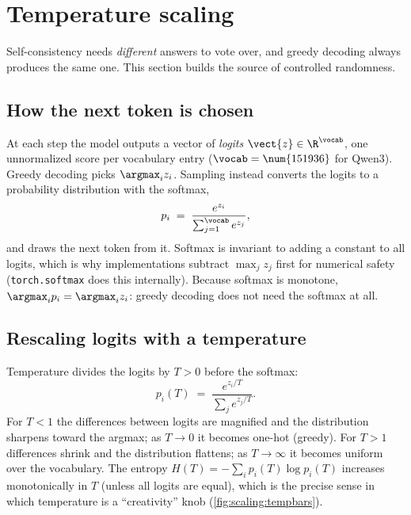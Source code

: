 \section{Temperature scaling}\label{sec:scaling:temp}

Self-consistency needs \emph{different} answers to vote over, and greedy decoding always produces
the same one. This section builds the source of controlled randomness.

\subsection{How the next token is chosen}\label{sec:scaling:select}
At each step the model outputs a vector of \emph{logits} $\vect{z} \in \R^{\vocab}$, one unnormalized
score per vocabulary entry ($\vocab = \num{151936}$ for Qwen3). Greedy decoding picks
$\argmax_i z_i$. Sampling instead converts the logits to a probability distribution with the
softmax,
\begin{equation}
  p_i \;=\; \frac{e^{z_i}}{\sum_{j=1}^{\vocab} e^{z_j}},
\end{equation}
and draws the next token from it. Softmax is invariant to adding a constant to all logits, which is
why implementations subtract $\max_j z_j$ first for numerical safety (\texttt{torch.softmax} does
this internally). Because softmax is monotone, $\argmax_i p_i = \argmax_i z_i$: greedy decoding
does not need the softmax at all.

\subsection{Rescaling logits with a temperature}\label{sec:scaling:rescale}
Temperature divides the logits by $T > 0$ before the softmax:
\begin{equation}
  p_i(T) \;=\; \frac{e^{z_i/T}}{\sum_j e^{z_j/T}}.
  \label{eq:scaling:temp}
\end{equation}
For $T < 1$ the differences between logits are magnified and the distribution sharpens toward the
argmax; as $T \to 0$ it becomes one-hot (greedy). For $T > 1$ differences shrink and the
distribution flattens; as $T \to \infty$ it becomes uniform over the vocabulary. The entropy
$H(T) = -\sum_i p_i(T) \log p_i(T)$ increases monotonically in $T$ (unless all logits are equal),
which is the precise sense in which temperature is a ``creativity'' knob
(\cref{fig:scaling:tempbars}).

